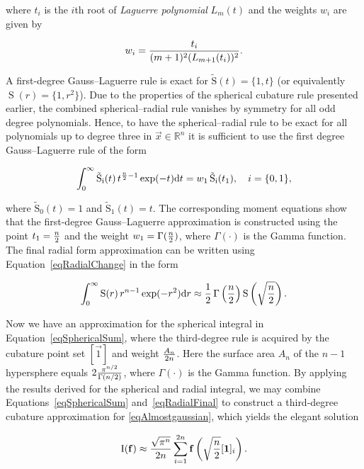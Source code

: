 where $t_i$ is the $i$th root of \emph{Laguerre polynomial} $L_m(t)$ and the weights $w_i$ are given by \citep{Abramowitz+Stegun:1964} 

  $$w_i = {t_i \over (m+1)^2(L_{m+1}(t_i))^2}.$$

\noindent%
A first-degree Gauss--Laguerre rule is exact for $\operatorname{\tilde{S}}(t)=\{1,t\}$ (or equivalently $\operatorname{S}(r)=\{1,r^2\}$). Due to the properties of the spherical cubature rule presented earlier, the combined spherical--radial rule vanishes by symmetry for all odd degree polynomials. Hence, to have the spherical--radial rule to be exact for all polynomials up to degree three in $\vec{x} \in \mathbb{R}^n$ it is sufficient to use the first degree Gauss--Laguerre rule of the form \citep{Arasaratnam:2009}

\begin{equation*}
    \int_0^\infty \operatorname{\tilde{S}_i}(t) \, t^{{n \over 2}-1} \exp(-t) \diff t = 
    w_1 \operatorname{\tilde{S}_i}(t_1),\quad i=\{0,1\},
\end{equation*}

\noindent%
where $\operatorname{\tilde{S}_0}(t)=1$ and $\operatorname{\tilde{S}_1}(t)=t$. The corresponding moment equations show that the first-degree Gauss--Laguerre approximation is constructed using the point $t_1 = {n \over 2}$ and the weight $w_1 = \Gamma({n \over 2})$, where $\Gamma(\cdot)$ is the Gamma function. The final radial form approximation can be written using Equation~\eqref{eqRadialChange} in the form

\begin{equation} \label{eqRadialFinal}
    \int_0^\infty \operatorname{S}(r) \, r^{n-1} \exp(-r^2) \diff r \approx
    {1 \over 2}\, \Gamma\left({n \over 2}\right)\operatorname{S}\left( \sqrt{{n \over 2}} \right).
\end{equation}

Now we have an approximation for the spherical integral in Equation~\eqref{eqSphericalSum}, where the third-degree rule is acquired by the cubature point set $[\vec{1}]$ and weight ${A_n \over 2n}$. Here the surface area $A_n$ of the $n-1$ hypersphere equals $2 {\pi^{n/2} \over \Gamma(n/2)}$, where $\Gamma(\cdot)$ is the Gamma function. 
By applying the results derived for the spherical and radial integral, we may combine Equations~\eqref{eqSphericalSum} and~\eqref{eqRadialFinal} to construct a third-degree cubature approximation for \eqref{eqAlmostgaussian}, which yields the elegant solution

\begin{equation*}
    \operatorname{I}(\vec{f}) 
    \approx {\sqrt{\pi^n} \over 2n} \sum_{i=1}^{2n} \vec{f}\left( \sqrt{{n \over 2}} [\vec{1}]_i \right).
\end{equation*}

